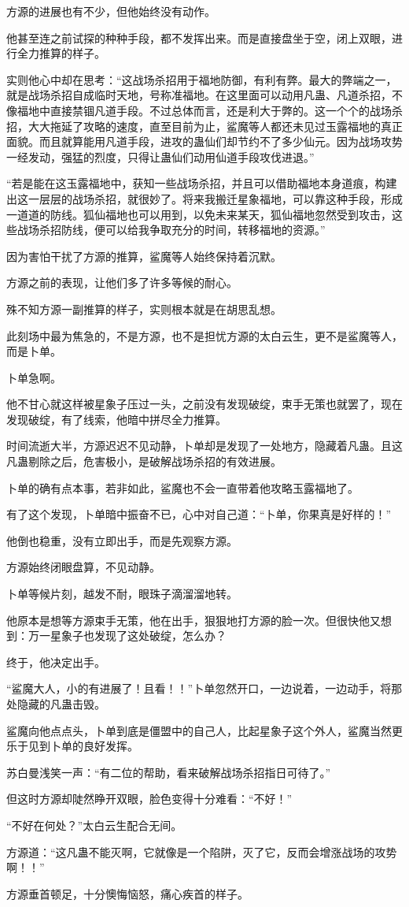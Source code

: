 \begin{this_body}
方源的进展也有不少，但他始终没有动作。

他甚至连之前试探的种种手段，都不发挥出来。而是直接盘坐于空，闭上双眼，进行全力推算的样子。

实则他心中却在思考：“这战场杀招用于福地防御，有利有弊。最大的弊端之一，就是战场杀招自成临时天地，号称准福地。在这里面可以动用凡蛊、凡道杀招，不像福地中直接禁锢凡道手段。不过总体而言，还是利大于弊的。这一个个的战场杀招，大大拖延了攻略的速度，直至目前为止，鲨魔等人都还未见过玉露福地的真正面貌。而且就算能用凡道手段，进攻的蛊仙们却节约不了多少仙元。因为战场攻势一经发动，强猛的烈度，只得让蛊仙们动用仙道手段攻伐进退。”

“若是能在这玉露福地中，获知一些战场杀招，并且可以借助福地本身道痕，构建出这一层层的战场杀招，就很妙了。将来我搬迁星象福地，可以靠这种手段，形成一道道的防线。狐仙福地也可以用到，以免未来某天，狐仙福地忽然受到攻击，这些战场杀招防线，便可以给我争取充分的时间，转移福地的资源。”

因为害怕干扰了方源的推算，鲨魔等人始终保持着沉默。

方源之前的表现，让他们多了许多等候的耐心。

殊不知方源一副推算的样子，实则根本就是在胡思乱想。

此刻场中最为焦急的，不是方源，也不是担忧方源的太白云生，更不是鲨魔等人，而是卜单。

卜单急啊。

他不甘心就这样被星象子压过一头，之前没有发现破绽，束手无策也就罢了，现在发现破绽，有了线索，他暗中拼尽全力推算。

时间流逝大半，方源迟迟不见动静，卜单却是发现了一处地方，隐藏着凡蛊。且这凡蛊剔除之后，危害极小，是破解战场杀招的有效进展。

卜单的确有点本事，若非如此，鲨魔也不会一直带着他攻略玉露福地了。

有了这个发现，卜单暗中振奋不已，心中对自己道：“卜单，你果真是好样的！”

他倒也稳重，没有立即出手，而是先观察方源。

方源始终闭眼盘算，不见动静。

卜单等候片刻，越发不耐，眼珠子滴溜溜地转。

他原本是想等方源束手无策，他在出手，狠狠地打方源的脸一次。但很快他又想到：万一星象子也发现了这处破绽，怎么办？

终于，他决定出手。

“鲨魔大人，小的有进展了！且看！！”卜单忽然开口，一边说着，一边动手，将那处隐藏的凡蛊击毁。

鲨魔向他点点头，卜单到底是僵盟中的自己人，比起星象子这个外人，鲨魔当然更乐于见到卜单的良好发挥。

苏白曼浅笑一声：“有二位的帮助，看来破解战场杀招指日可待了。”

但这时方源却陡然睁开双眼，脸色变得十分难看：“不好！”

“不好在何处？”太白云生配合无间。

方源道：“这凡蛊不能灭啊，它就像是一个陷阱，灭了它，反而会增涨战场的攻势啊！！”

方源垂首顿足，十分懊悔恼怒，痛心疾首的样子。

\end{this_body}

